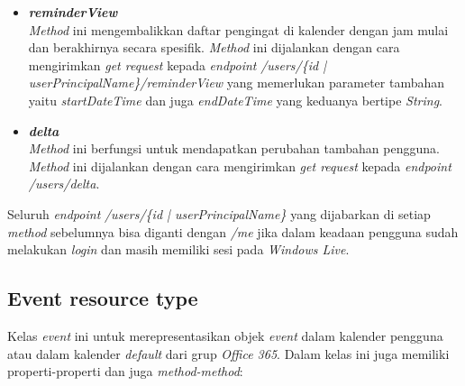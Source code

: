 \begin{itemize}
	\item \textbf{\textit{reminderView}}\\
	\textit{Method} ini mengembalikkan daftar pengingat di kalender dengan jam mulai dan berakhirnya secara spesifik. \textit{Method} ini dijalankan dengan cara mengirimkan \textit{get request} kepada \textit{endpoint} \textit{/users/\{id | userPrincipalName\}/reminderView} yang memerlukan parameter tambahan yaitu \textit{startDateTime} dan juga \textit{endDateTime} yang keduanya bertipe \textit{String}.
	\item \textbf{\textit{delta}}\\
	\textit{Method} ini berfungsi untuk mendapatkan perubahan tambahan pengguna. \textit{Method} ini dijalankan dengan cara mengirimkan \textit{get request} kepada \textit{endpoint} \textit{/users/delta}.
\end{itemize}

Seluruh \textit{endpoint} \textit{/users/\{id | userPrincipalName\}} yang dijabarkan di setiap \textit{method} sebelumnya bisa diganti dengan \textit{/me} jika dalam keadaan pengguna sudah melakukan \textit{login} dan masih memiliki sesi pada \textit{Windows Live}. 

\subsection{Event resource type}
Kelas \textit{event} ini untuk merepresentasikan objek \textit{event} dalam kalender pengguna atau dalam kalender \textit{default} dari grup \textit{Office 365}. Dalam kelas ini juga memiliki properti-properti dan juga \textit{method-method}:
